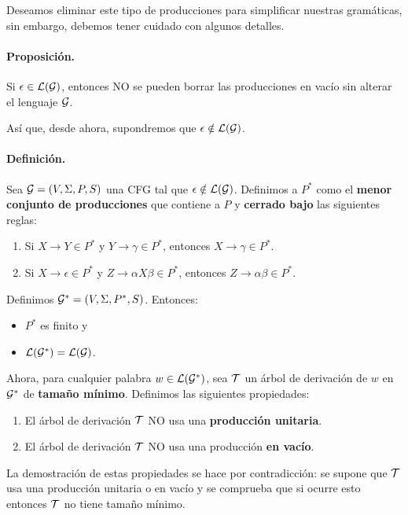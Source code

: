 Deseamos eliminar este tipo de producciones para simplificar nuestras gramáticas, sin embargo, debemos tener cuidado con algunos detalles.

\paragraph{Proposición.} Si $\epsilon \in \mathcal{L}(\mathcal{G})$, entonces NO se pueden borrar las producciones en vacío sin alterar el lenguaje $\mathcal{G}$. \medbreak

Así que, desde ahora, supondremos que $\epsilon \notin \mathcal{L}(\mathcal{G})$.

\paragraph{Definición.} Sea $\mathcal{G} = (V, \Sigma, P, S)$ una CFG tal que $\epsilon \notin \mathcal{L}(\mathcal{G})$. Definimos a $P^*$ como el \textbf{menor conjunto de producciones} que contiene a $P$ y \textbf{cerrado bajo} las siguientes reglas:
\begin{enumerate}
    \item Si $X \to Y \in P^*$ y $Y \to \gamma \in P^*$, entonces $X \to \gamma \in P^*$.
    \item Si $X \to \epsilon \in P^*$ y $Z \to \alpha X \beta \in P^*$, entonces $Z \to \alpha \beta \in P^*$.
\end{enumerate}
Definimos $\mathcal{G}^* = (V, \Sigma, P^*, S)$. Entonces:
\begin{itemize}
    \item $P^*$ es finito y
    \item $\mathcal{L}(\mathcal{G}^*) = \mathcal{L}(\mathcal{G})$.
\end{itemize}

Ahora, para cualquier palabra $w \in \mathcal{L}(\mathcal{G}^*)$, sea $\mathcal{T}$ un árbol de derivación de $w$ en $\mathcal{G}^*$ de \textbf{tamaño mínimo}. Definimos las siguientes propiedades:
\begin{enumerate}
    \item El árbol de derivación $\mathcal{T}$ NO usa una \textbf{producción unitaria}.
    \item El árbol de derivación $\mathcal{T}$ NO usa una producción \textbf{en vacío}.
\end{enumerate}

La demostración de estas propiedades se hace por contradicción: se supone que $\mathcal{T}$ usa una producción unitaria o en vacío y se comprueba que si ocurre esto entonces $\mathcal{T}$ no tiene tamaño mínimo. \bigbreak


